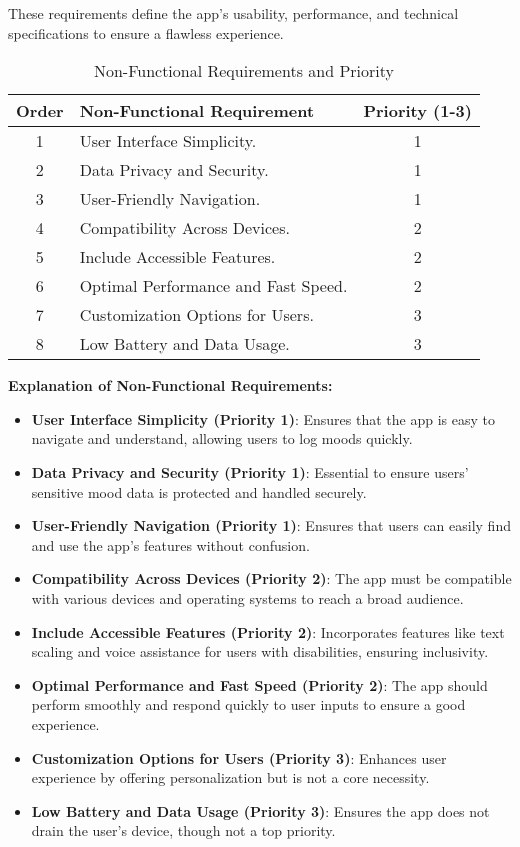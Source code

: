 These requirements define the app’s usability, performance, and technical specifications to ensure a flawless experience. \vspace{5mm}

\FloatBarrier
\begin{table}[ht]
\centering
\begin{tabular}{|c|p{7cm}|c|} \hline
\textbf{Order} & \textbf{Non-Functional Requirement} & \textbf{Priority (1-3)} \\ \hline
1 & User Interface Simplicity. & 1 \\ \hline
2 & Data Privacy and Security. & 1 \\ \hline
3 & User-Friendly Navigation. & 1 \\ \hline
4 & Compatibility Across Devices. & 2 \\ \hline
5 & Include Accessible Features. & 2 \\ \hline
6 & Optimal Performance and Fast Speed. & 2 \\ \hline
7 & Customization Options for Users. & 3 \\ \hline
8 & Low Battery and Data Usage. & 3 \\ \hline
\end{tabular}
\caption{Non-Functional Requirements and Priority}
\label{tab:non_functional_requirements}
\end{table}
\FloatBarrier

\noindent \textbf{Explanation of Non-Functional Requirements:}
\begin{itemize}
    \item \textbf{User Interface Simplicity (Priority 1)}: Ensures that the app is easy to navigate and understand, allowing users to log moods quickly.
    \item \textbf{Data Privacy and Security (Priority 1)}: Essential to ensure users' sensitive mood data is protected and handled securely.
    \item \textbf{User-Friendly Navigation (Priority 1)}: Ensures that users can easily find and use the app’s features without confusion.
    \item \textbf{Compatibility Across Devices (Priority 2)}: The app must be compatible with various devices and operating systems to reach a broad audience.
    \item \textbf{Include Accessible Features (Priority 2)}: Incorporates features like text scaling and voice assistance for users with disabilities, ensuring inclusivity.
    \item \textbf{Optimal Performance and Fast Speed (Priority 2)}: The app should perform smoothly and respond quickly to user inputs to ensure a good experience.
    \item \textbf{Customization Options for Users (Priority 3)}: Enhances user experience by offering personalization but is not a core necessity.
    \item \textbf{Low Battery and Data Usage (Priority 3)}: Ensures the app does not drain the user's device, though not a top priority.
\end{itemize}

